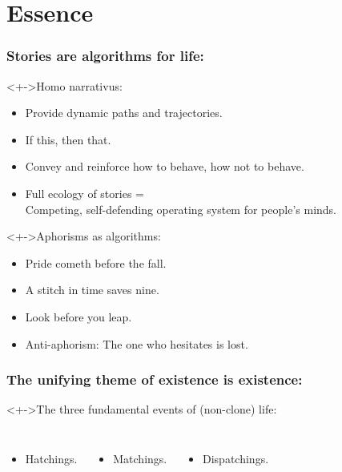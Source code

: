 \section{Essence}

\begin{frame}
  \frametitle{Stories are algorithms for life:}

  \begin{block}<+->{Homo narrativus:}
    \begin{itemize}
    \item<+->
      Provide dynamic paths and trajectories.
    \item<+->
      If this, then that.
    \item<+->
      Convey and reinforce how to behave, how not to behave.
    \item<+->
      Full ecology of stories 
      = \\
      Competing, self-defending operating system
      for people's minds.
    \end{itemize}
  \end{block}

  \begin{block}<+->{Aphorisms as algorithms:}
    \begin{itemize}
    \item<+->
      Pride cometh before the fall.
    \item<+->
      A stitch in time saves nine.
    \item<+->
      Look before you leap.
    \item<+->
      Anti-aphorism: The one who hesitates is lost.
    \end{itemize}
  \end{block}
  
\end{frame}

\begin{frame}
  \small
  
  \frametitle{The unifying theme of existence is existence:}

  \begin{block}<+->{The three fundamental events of (non-clone) life:}
    \begin{columns}
      \begin{itemize}
      \item
        Hatchings.
      \end{itemize}
      \begin{itemize}
      \item
        Matchings.
      \end{itemize}
      \begin{itemize}
      \item
        Dispatchings.
      \end{itemize}
    \end{columns}
  \end{block}

\end{frame}


